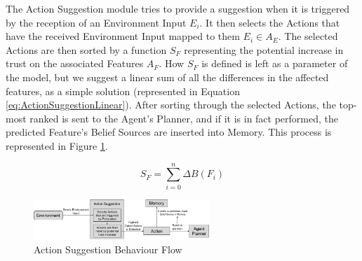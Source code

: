 The Action Suggestion module tries to provide a suggestion when it is triggered by the reception of an Environment Input $E_i$. It then selects the Actions that have the received Environment Input mapped to them $E_i \in A_E$. The selected Actions are then sorted by a function $S_F$ representing the potential increase in trust on the associated Features $A_F$. How $S_F$ is defined is left as a parameter of the model, but we suggest a linear sum of all the differences in the affected features, as a simple solution (represented in Equation \ref{eq:ActionSuggestionLinear}). After sorting through the selected Actions, the top-most ranked is sent to the Agent's Planner, and if it is in fact performed, the predicted Feature's Belief Sources are inserted into Memory. This process is represented in Figure \ref{fig:ActionSuggestionDiagram}.

\begin{equation}
S_F = \sum_{i=0}^{n} \Delta B(F_i)
\label{eq:ActionSuggestionLinear}
\end{equation}


\begin{figure}[hbt]
    \centering
    \includegraphics[width=250px]{figures/ActionSuggestionDiagram.jpg}
    \caption{Action Suggestion Behaviour Flow}
    \label{fig:ActionSuggestionDiagram}
\end{figure}



